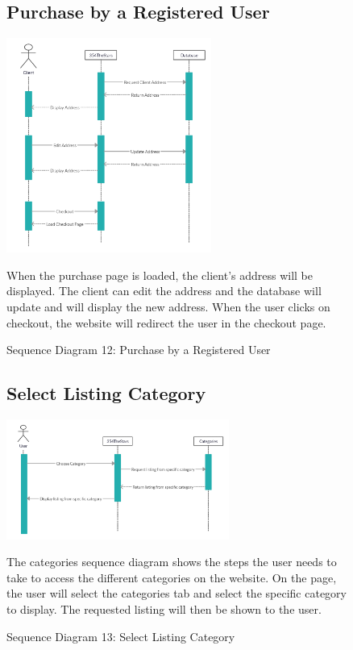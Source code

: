 \documentclass[11pt]{article}
\newcounter{use case ID}
\newcounter{req ID}
\begin{document}
\begin{figure}[ht!]
    \subsection{Purchase by a Registered User}
    \centering
    \includegraphics[width=0.6\textwidth,height=0.3\paperheight]{Diagrams/Sequence/Registered_User_Purchase.jpg} 
    \caption{Sequence Diagram 12: Purchase by a Registered User}
    \label{fig: Purchase by a Registered User}
    \begin{flushleft}
        When the purchase page is loaded, the client's address will be displayed. The client can edit the address and the database will update and will display the new address. When the user clicks on checkout, the website will redirect the user in the checkout page.
    \end{flushleft}
\end{figure}

\begin{figure}[ht!]
    \subsection{Select Listing Category}
    \centering
    \includegraphics[width=0.65\textwidth,height=0.2\paperheight]{Diagrams/Sequence/Categories.png} 
    \caption{Sequence Diagram 13: Select Listing Category}
    \label{fig: Select Listing Category}
    \begin{flushleft}
        The categories sequence diagram shows the steps the user needs to take to access the different categories on the website. On the page, the user will select the categories tab and select the specific category to display. The requested listing will then be shown to the user. 
    \end{flushleft}
\end{figure}
\end{document}
